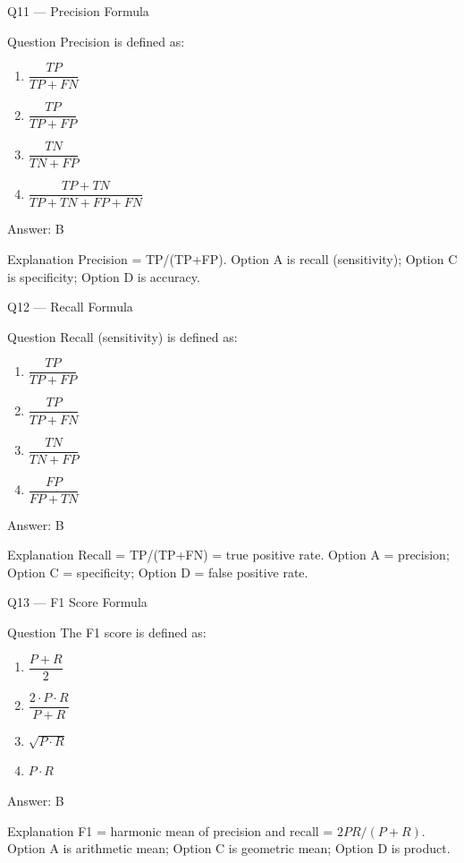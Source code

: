 \documentclass[aspectratio=169,8pt]{beamer}
\begin{document}
	\begin{frame}{Q11 --- Precision Formula}
		\begin{block}{Question}
			Precision is defined as:
			\begin{enumerate}
				\item $\dfrac{TP}{TP + FN}$
				\item $\dfrac{TP}{TP + FP}$
				\item $\dfrac{TN}{TN + FP}$
				\item $\dfrac{TP + TN}{TP + TN + FP + FN}$
			\end{enumerate}
		\end{block}
		\begin{exampleblock}{Answer: B}\end{exampleblock}
		\begin{block}{Explanation}
			Precision = TP/(TP+FP). Option A is recall (sensitivity); Option C is specificity; Option D is accuracy.
		\end{block}
	\end{frame}
	
	\begin{frame}{Q12 --- Recall Formula}
		\begin{block}{Question}
			Recall (sensitivity) is defined as:
			\begin{enumerate}
				\item $\dfrac{TP}{TP + FP}$
				\item $\dfrac{TP}{TP + FN}$
				\item $\dfrac{TN}{TN + FP}$
				\item $\dfrac{FP}{FP + TN}$
			\end{enumerate}
		\end{block}
		\begin{exampleblock}{Answer: B}\end{exampleblock}
		\begin{block}{Explanation}
			Recall = TP/(TP+FN) = true positive rate. Option A = precision; Option C = specificity; Option D = false positive rate.
		\end{block}
	\end{frame}
	
	\begin{frame}{Q13 --- F1 Score Formula}
		\begin{block}{Question}
			The F1 score is defined as:
			\begin{enumerate}
				\item $\dfrac{P + R}{2}$
				\item $\dfrac{2 \cdot P \cdot R}{P + R}$
				\item $\sqrt{P \cdot R}$
				\item $P \cdot R$
			\end{enumerate}
		\end{block}
		\begin{exampleblock}{Answer: B}\end{exampleblock}
		\begin{block}{Explanation}
			F1 = harmonic mean of precision and recall = $2PR/(P+R)$. Option A is arithmetic mean; Option C is geometric mean; Option D is product.
		\end{block}
	\end{frame}
	
\end{document}
